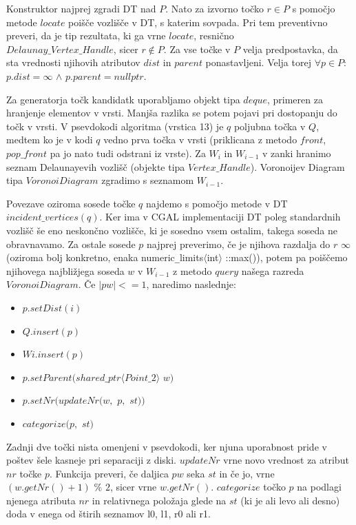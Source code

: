 \documentclass[a4paper, 12pt]{book}
\begin{document}
Konstruktor najprej zgradi DT nad $P$. Nato za izvorno točko $r\in P$ s pomočjo metode $locate$ poišče vozlišče v DT, s katerim sovpada. Pri tem preventivno preveri, da je tip rezultata, ki ga vrne $locate$, resnično \\ 
$Delaunay\texttt{\_}Vertex\texttt{\_}Handle$, sicer $r\notin P$. Za vse točke v $P$ velja predpostavka, da sta vrednosti njihovih atributov $dist$ in $parent$ ponastavljeni. Velja torej $\forall p\in P:$ $p.dist = \infty$ $\wedge$ $p.parent = nullptr$. 

Za generatorja točk kandidatk uporabljamo objekt tipa $deque$, primeren za hranjenje elementov v vrsti. Manjša razlika se potem pojavi pri dostopanju do točk v vrsti. V psevdokodi algoritma (vrstica 13) je $q$ poljubna točka v $Q$, medtem ko je v kodi $q$ vedno prva točka v vrsti (priklicana z metodo $front$, $pop\texttt{\_}front$ pa jo nato tudi odstrani iz vrste). Za $W_i$ in $W_{i-1}$ v zanki hranimo seznam Delaunayevih vozlišč (objekte tipa $Vertex\texttt{\_}Handle$). Voronoijev Diagram tipa $VoronoiDiagram$ zgradimo s seznamom $W_{i-1}$.

Povezave oziroma sosede točke $q$ najdemo s pomočjo metode v DT \\ $incident\texttt{\_}vertices(q)$. Ker ima v CGAL implementaciji DT poleg standardnih vozlišč še eno neskončno vozlišče, ki je sosedno vsem ostalim, takega soseda ne obravnavamo. Za ostale sosede $p$ najprej preverimo, če je njihova razdalja do $r$ $\infty$ (oziroma bolj konkretno, enaka numeric\texttt{\_}limits$\langle$int$\rangle$ ::max()), potem pa poiščemo njihovega najbližjega soseda $w$ v $W_{i-1}$ z metodo $query$ našega razreda $VoronoiDiagram$. Če $|pw| <= 1$, naredimo naslednje:

\begin{itemize}
\item $p.setDist(i)$
\item $Q.insert(p)$
\item $Wi.insert(p)$
\item $p.setParent(shared\texttt{\_}ptr\langle Point\texttt{\_}2\rangle  $ $w)$
\item $p.setNr(updateNr(w,$ $p,$ $st))$
\item $categorize(p,$ $st)$
\end{itemize}

Zadnji dve točki nista omenjeni v psevdokodi, ker njuna uporabnost pride v poštev šele kasneje pri separaciji z diski. $updateNr$ vrne novo vrednost za atribut $nr$ točke $p$. Funkcija preveri, če daljica $pw$ seka $st$ in če jo, vrne $(w.getNr() + 1)$ $\%$ $2$, sicer vrne $w.getNr()$. $categorize$ točko $p$ na podlagi njenega atributa $nr$ in relativnega položaja glede na $st$ (ki je ali levo ali desno) doda v enega od štirih seznamov l0, l1, r0 ali r1.
\end{document}
